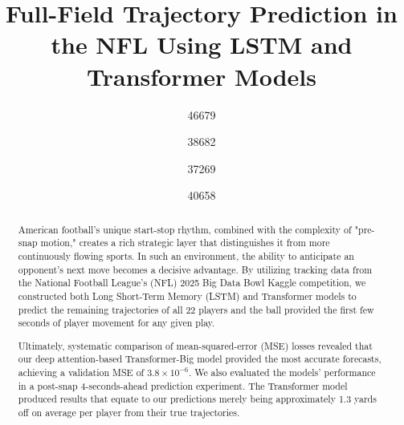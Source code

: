 \documentclass[sigconf]{acmart}
\begin{document}
\title{Full-Field Trajectory Prediction in the NFL Using LSTM and Transformer Models}

\author{46679}

\author{38682}

\author{37269}

\author{40658}

\renewcommand{\shortauthors}{LSE}

\begin{abstract}
American football's unique start-stop rhythm, combined with the complexity of "pre-snap motion," creates a rich strategic layer that distinguishes it from more continuously flowing sports. In such an environment, the ability to anticipate an opponent's next move becomes a decisive advantage. By utilizing tracking data from the National Football League's (NFL) 2025 Big Data Bowl Kaggle competition, we constructed both Long Short-Term Memory (LSTM) and Transformer models to predict the remaining trajectories of all 22 players and the ball provided the first few seconds of player movement for any given play.

Ultimately, systematic comparison of mean-squared-error (MSE) losses revealed that our deep attention-based Transformer-Big model provided the most accurate forecasts, achieving a validation MSE of $3.8\times 10^{-6} $. We also evaluated the models' performance in a post-snap 4-seconds-ahead prediction experiment. The Transformer model produced results that equate to our predictions merely being approximately 1.3 yards off on average per player from their true trajectories.
\end{abstract}
\end{document}
